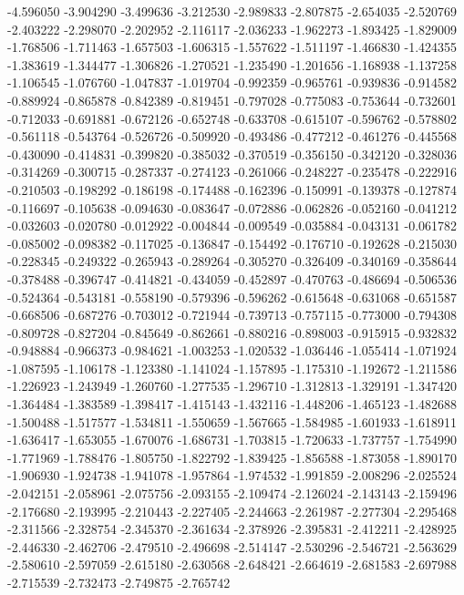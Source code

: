 -4.596050
-3.904290
-3.499636
-3.212530
-2.989833
-2.807875
-2.654035
-2.520769
-2.403222
-2.298070
-2.202952
-2.116117
-2.036233
-1.962273
-1.893425
-1.829009
-1.768506
-1.711463
-1.657503
-1.606315
-1.557622
-1.511197
-1.466830
-1.424355
-1.383619
-1.344477
-1.306826
-1.270521
-1.235490
-1.201656
-1.168938
-1.137258
-1.106545
-1.076760
-1.047837
-1.019704
-0.992359
-0.965761
-0.939836
-0.914582
-0.889924
-0.865878
-0.842389
-0.819451
-0.797028
-0.775083
-0.753644
-0.732601
-0.712033
-0.691881
-0.672126
-0.652748
-0.633708
-0.615107
-0.596762
-0.578802
-0.561118
-0.543764
-0.526726
-0.509920
-0.493486
-0.477212
-0.461276
-0.445568
-0.430090
-0.414831
-0.399820
-0.385032
-0.370519
-0.356150
-0.342120
-0.328036
-0.314269
-0.300715
-0.287337
-0.274123
-0.261066
-0.248227
-0.235478
-0.222916
-0.210503
-0.198292
-0.186198
-0.174488
-0.162396
-0.150991
-0.139378
-0.127874
-0.116697
-0.105638
-0.094630
-0.083647
-0.072886
-0.062826
-0.052160
-0.041212
-0.032603
-0.020780
-0.012922
-0.004844
-0.009549
-0.035884
-0.043131
-0.061782
-0.085002
-0.098382
-0.117025
-0.136847
-0.154492
-0.176710
-0.192628
-0.215030
-0.228345
-0.249322
-0.265943
-0.289264
-0.305270
-0.326409
-0.340169
-0.358644
-0.378488
-0.396747
-0.414821
-0.434059
-0.452897
-0.470763
-0.486694
-0.506536
-0.524364
-0.543181
-0.558190
-0.579396
-0.596262
-0.615648
-0.631068
-0.651587
-0.668506
-0.687276
-0.703012
-0.721944
-0.739713
-0.757115
-0.773000
-0.794308
-0.809728
-0.827204
-0.845649
-0.862661
-0.880216
-0.898003
-0.915915
-0.932832
-0.948884
-0.966373
-0.984621
-1.003253
-1.020532
-1.036446
-1.055414
-1.071924
-1.087595
-1.106178
-1.123380
-1.141024
-1.157895
-1.175310
-1.192672
-1.211586
-1.226923
-1.243949
-1.260760
-1.277535
-1.296710
-1.312813
-1.329191
-1.347420
-1.364484
-1.383589
-1.398417
-1.415143
-1.432116
-1.448206
-1.465123
-1.482688
-1.500488
-1.517577
-1.534811
-1.550659
-1.567665
-1.584985
-1.601933
-1.618911
-1.636417
-1.653055
-1.670076
-1.686731
-1.703815
-1.720633
-1.737757
-1.754990
-1.771969
-1.788476
-1.805750
-1.822792
-1.839425
-1.856588
-1.873058
-1.890170
-1.906930
-1.924738
-1.941078
-1.957864
-1.974532
-1.991859
-2.008296
-2.025524
-2.042151
-2.058961
-2.075756
-2.093155
-2.109474
-2.126024
-2.143143
-2.159496
-2.176680
-2.193995
-2.210443
-2.227405
-2.244663
-2.261987
-2.277304
-2.295468
-2.311566
-2.328754
-2.345370
-2.361634
-2.378926
-2.395831
-2.412211
-2.428925
-2.446330
-2.462706
-2.479510
-2.496698
-2.514147
-2.530296
-2.546721
-2.563629
-2.580610
-2.597059
-2.615180
-2.630568
-2.648421
-2.664619
-2.681583
-2.697988
-2.715539
-2.732473
-2.749875
-2.765742
